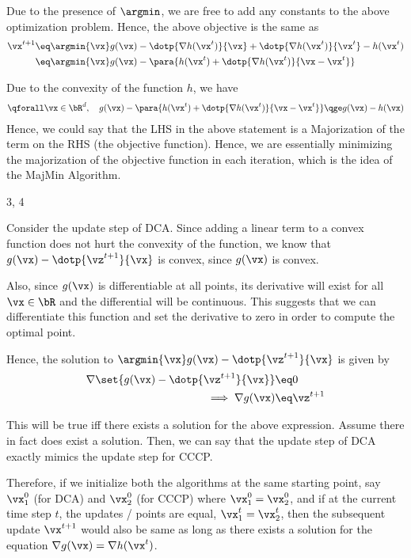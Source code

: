 \documentclass{article}
\begin{document}
\begin{question}
\begin{qpart}{2}
		Due to the presence of $\argmin$, we are free to add any constants to the above optimization problem. Hence, the above objective is the same as
		\begin{align*}
			\vx^{t + 1} &\eq \argmin{\vx} g(\vx) - \dotp{\nabla h(\vx^t)}{\vx} + \dotp{\nabla h(\vx^t)}{\vx^t} - h(\vx^t) \\
			&\eq \argmin{\vx} g(\vx) - \para{h(\vx^t) + \dotp{\nabla h(\vx^t)}{\vx - \vx^t}}
		\end{align*}

		Due to the convexity of the function $h$, we have
		\begin{align*}
			\qforall \vx \in \bR^d, \quad g(\vx) - \para{h(\vx^t) + \dotp{\nabla h(\vx^t)}{\vx - \vx^t}} \qge g(\vx) - h(\vx)
		\end{align*}
		Hence, we could say that the LHS in the above statement is a Majorization of the term on the RHS (the objective function). Hence, we are essentially minimizing the majorization of the objective function in each iteration, which is the idea of the MajMin Algorithm.

	\end{qpart}

	\begin{qpart}{3, 4}

		Consider the update step of DCA. Since adding a linear term to a convex function does not hurt the convexity of the function, we know that $g(\vx) - \dotp{\vz^{t + 1}}{\vx}$ is convex, since $g(\vx)$ is convex.

		Also, since $g(\vx)$ is differentiable at all points, its derivative will exist for all $\vx \in \bR$ and the differential will be continuous. This suggests that we can differentiate this function and set the derivative to zero in order to compute the optimal point.

		Hence, the solution to $\argmin{\vx} g(\vx) - \dotp{\vz^{t + 1}}{\vx}$ is given by
		\begin{align*}
			\nabla \set{g(\vx) - \dotp{\vz^{t + 1}}{\vx}} &\eq 0 \\
			\implies \nabla g(\vx) &\eq \vz^{t + 1}
		\end{align*}

		This will be true iff there exists a solution for the above expression. Assume there in fact does exist a solution. Then, we can say that the update step of DCA exactly mimics the update step for CCCP.

		Therefore, if we initialize both the algorithms at the same starting point, say $\vx_1^0$ (for DCA) and $\vx_2^0$ (for CCCP) where $\vx_1^0 = \vx_2^0$, and if at the current time step $t$, the updates / points are equal, \ie $\vx_1^t = \vx_2^t$, then the subsequent update $\vx^{t + 1}$ would also be same as long as there exists a solution for the equation $\nabla g(\vx) = \nabla h(\vx^t)$.


\end{qpart}
\end{question}
\end{document}
